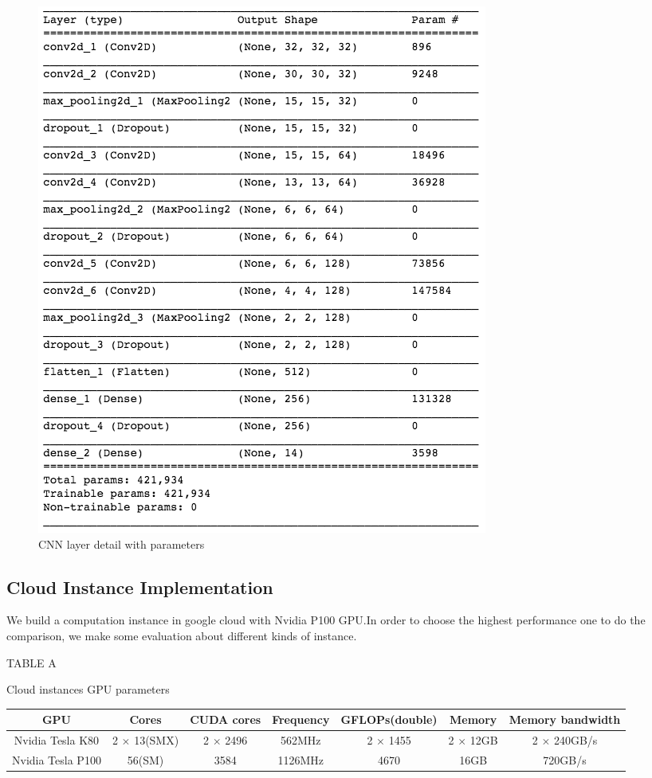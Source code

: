 \documentclass[conference]{IEEEtran}
\begin{document}
\begin{figure}[hb]
\centering
  \begin{minipage}{.4\textwidth}
    \centering
    \includegraphics[width=0.8\linewidth]{archi_param.png}
    \caption{CNN layer detail with parameters}
    \label{fig:fig_1}
  \end{minipage}
\end{figure}


\subsection{Cloud Instance Implementation}

We build a computation instance in google cloud with Nvidia P100 GPU.In order to choose the highest performance one to do the comparison, we make some evaluation about different kinds of instance. 

\begin{table}
\centerline { TABLE A  } 
\vskip5pt
\centerline {Cloud instances GPU parameters}
\vskip2pt
\centering
\begin{tabular}{|c|c|c|c|c|c|c|}
\toprule
\textbf{GPU} & \textbf{Cores} & \textbf{CUDA cores} & \textbf{Frequency} & \textbf{GFLOPs(double)} & \textbf{Memory} & \textbf{Memory bandwidth}\\
\midrule
Nvidia Tesla K80 & 2 $\times$ 13(SMX) & 2 $\times$ 2496 & 562MHz & 2 $\times$ 1455 & 2 $\times$ 12GB & 2 $\times$ 240GB/s \\
\hline
Nvidia Tesla P100 & 56(SM) & 3584 & 1126MHz & 4670 & 16GB & 720GB/s\\
\bottomrule
\end{tabular}
\end{table}
\end{document}
